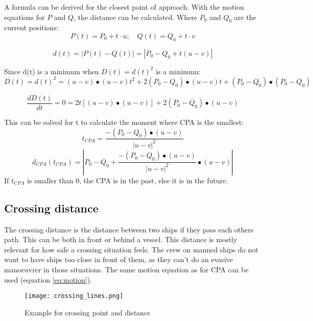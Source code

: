 A formula can be derived for the closest point of approach. With the motion equations for $P$ and $Q$, the distance can be calculated. Where $P_0$ and $Q_0$ are the current positions:
\begin{equation}
	\label{eq:motion}
	P(t) = P_0 + t \cdot u ;\quad  Q(t) = Q_0 + t \cdot v
\end{equation}

\begin{equation}
	d(t) = |P(t) - Q(t)| = |P_0 - Q_0 + t (u - v)|
\end{equation}

Since d(t) is a minimum when $D(t) = d(t)^2$ is a minimum:
\begin{equation}
	D(t) = d(t)^2 = (u - v) \bullet (u - v) t^2 + 2 (P_0 - Q_0) \bullet (u - v) t + (P_0 - Q_0) \bullet (P_0 - Q_0)
\end{equation}

\begin{equation}
\frac{d D(t)}{dt} = 0 = 2t[(u - v) \bullet (u-v)] + 2 (P_0 - Q_0) \bullet (u - v)
\end{equation}

This can be solved for t to calculate the moment where CPA is the smallest:
\begin{equation}
	t_{CPA} = \frac{-(P_0 - Q_0) \bullet (u - v)}{|u - v|^2}
\end{equation}
\begin{equation}
	d_{CPA}(t_{CPA}) = |P_0 - Q_0 + \frac{-(P_0 - Q_0) \bullet (u - v)}{|u - v|^2} \bullet (u - v)|
\end{equation}
If $t_{CPA}$ is smaller than 0, the CPA is in the past, else it is in the future.

\subsection{Crossing distance}
The crossing distance is the distance between two ships if they pass each others path. This can be both in front or behind a vessel. This distance is mostly relevant for how safe a crossing situation feels. The crew on manned ships do not want to have ships too close in front of them, as they can't do an evasive manoeuvrer in those situations. The same motion equation as for CPA can be used (equation \ref{eq:motion}). 

\begin{figure}[h]
	\centering
	\texttt{[image: crossing\_lines.png]}
	\caption{Example for crossing point and distance}
	\label{fig:crossing-distance}
\end{figure}

